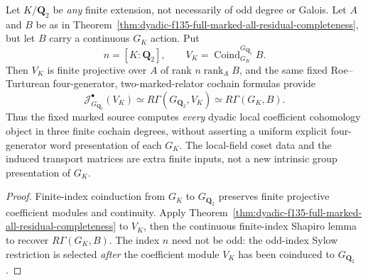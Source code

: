\begin{corollary}
\label{cor:dyadic-f135-all-finite-extensions-coinduced}
Let $K/\mathbf Q_2$
be \emph{any} finite
extension, not
necessarily of odd
degree or Galois.
Let $A$ and
$B$ be as in
Theorem~\ref{thm:dyadic-f135-full-marked-all-residual-completeness},
but let $B$ carry a
continuous $G_K$
action.
Put
\[
n=[K:\mathbf Q_2],
\qquad
V_K=\operatorname{Coind}_{G_K}^{G_{\mathbf Q_2}}B.
\]
Then $V_K$
is finite projective
over $A$ of rank
$n\operatorname{rank}_A B$,
and the same fixed
Roe--Turturean
four-generator,
two-marked-relator
cochain formulas
provide
\begin{equation}\label{eq:dyadic-f135-all-k-via-q2-marked}
\boxed{\quad
\mathcal J_{G_{\mathbf Q_2}}^\bullet(V_K)
\simeq
R\Gamma(G_{\mathbf Q_2},V_K)
\simeq
R\Gamma(G_K,B).
\quad}
\end{equation}
Thus the fixed
marked source
computes \emph{every}
dyadic local
coefficient cohomology
object in three
finite cochain
degrees, without
asserting a
uniform explicit
four-generator
word presentation
of each
$G_K$.
The local-field
coset data and
the induced
transport matrices
are extra finite
inputs, not a
new intrinsic
group presentation
of $G_K$.
\end{corollary}

\begin{proof}
Finite-index
coinduction from
$G_K$ to
$G_{\mathbf Q_2}$
preserves finite
projective
coefficient modules
and continuity.
Apply
Theorem~\ref{thm:dyadic-f135-full-marked-all-residual-completeness}
to $V_K$,
then the
continuous
finite-index
Shapiro lemma
to recover
$R\Gamma(G_K,B)$.
The index
$n$ need
not be odd:
the odd-index
Sylow restriction
is selected
\emph{after}
the coefficient
module $V_K$
has been
coinduced to
$G_{\mathbf Q_2}$.
\end{proof}

